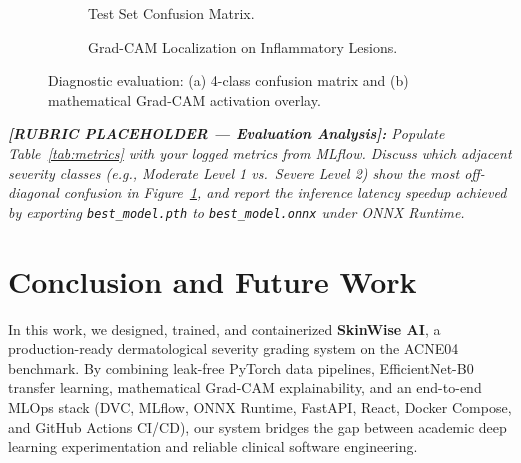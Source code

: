 \documentclass[11pt,a4paper]{article}
\begin{document}
\begin{figure}[H]
    \centering
    \begin{subfigure}[b]{0.47\textwidth}
        \centering
        \caption{Test Set Confusion Matrix.}
        \label{fig:cm}
    \end{subfigure}
    \hfill
    \begin{subfigure}[b]{0.47\textwidth}
        \centering
        \caption{Grad-CAM Localization on Inflammatory Lesions.}
        \label{fig:gradcam}
    \end{subfigure}
    \caption{Diagnostic evaluation: (a) 4-class confusion matrix and (b) mathematical Grad-CAM activation overlay.}
    \label{fig:eval_visuals}
\end{figure}

\noindent
\textit{\textbf{[RUBRIC PLACEHOLDER --- Evaluation Analysis]:} Populate Table~\ref{tab:metrics} with your logged metrics from MLflow. Discuss which adjacent severity classes (e.g., Moderate Level 1 vs.\ Severe Level 2) show the most off-diagonal confusion in Figure~\ref{fig:cm}, and report the inference latency speedup achieved by exporting \texttt{best\_model.pth} to \texttt{best\_model.onnx} under ONNX Runtime.}

\section{Conclusion and Future Work}
\label{sec:conclusion}
In this work, we designed, trained, and containerized \textbf{SkinWise AI}, a production-ready dermatological severity grading system on the ACNE04 benchmark. By combining leak-free PyTorch data pipelines, EfficientNet-B0 transfer learning, mathematical Grad-CAM explainability, and an end-to-end MLOps stack (DVC, MLflow, ONNX Runtime, FastAPI, React, Docker Compose, and GitHub Actions CI/CD), our system bridges the gap between academic deep learning experimentation and reliable clinical software engineering.
\end{document}
